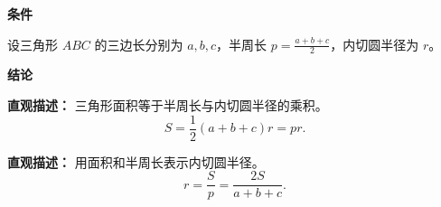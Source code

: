 \begin{statementbox}
	\textbf{\textcolor{CStatement}{条件}}
	\begin{description}[style=nextline, leftmargin=2.8em, labelsep=0.5em, itemsep=0.35em]
		\item[\textbf{\textcolor{CStatement}{条件 1（三边与半周长）：}}]
			设三角形 $ABC$ 的三边长分别为 $a,b,c$，半周长 $p=\frac{a+b+c}{2}$，内切圆半径为 $r$。
	\end{description}
	\textbf{\textcolor{CStatement}{结论}}
	\begin{description}[style=nextline, leftmargin=2.8em, labelsep=0.5em, itemsep=0.45em]
		\item[\textbf{\textcolor{CStatement}{结论一（面积公式）：}}]
			\textbf{\textcolor{CStatement}{直观描述：}}
			三角形面积等于半周长与内切圆半径的乘积。
			\[
				S = \frac{1}{2}(a+b+c)r = pr.
			\]
		\item[\textbf{\textcolor{CStatement}{常见变形（半径公式）：}}]
			\textbf{\textcolor{CStatement}{直观描述：}}
			用面积和半周长表示内切圆半径。
			\[
				r = \frac{S}{p} = \frac{2S}{a+b+c}.
			\]
	\end{description}

\end{statementbox}
